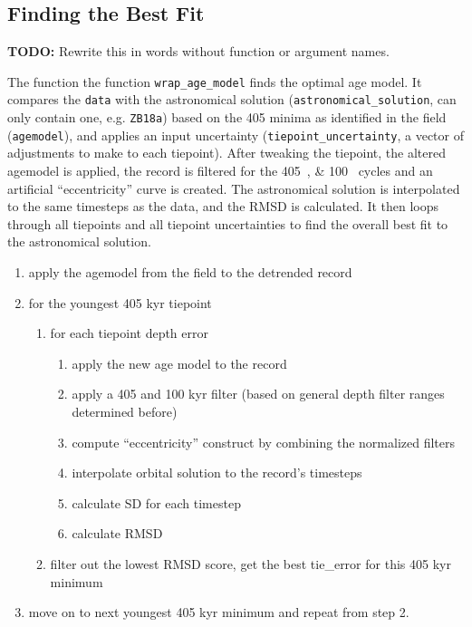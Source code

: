 \documentclass[draft]{agujournal2019}
\begin{document}
\subsection{Finding the Best Fit}

\textbf{TODO:} Rewrite this in words without function or argument names.

The function the function \texttt{wrap\_age\_model} finds the optimal age
model. It compares the \texttt{data} with the astronomical solution
(\texttt{astronomical\_solution}, can only contain one, e.g. \texttt{ZB18a})
based on the \qty{405}{\kiloyear} minima as identified in the field
(\texttt{agemodel}), and applies an input uncertainty
(\texttt{tiepoint\_uncertainty}, a vector of adjustments to make to each
tiepoint). After tweaking the tiepoint, the altered agemodel is applied, the
record is filtered for the \qtylist{405;100}{\kiloyear} cycles and an
artificial ``eccentricity'' curve is created. The astronomical solution is
interpolated to the same timesteps as the data, and the \gls{RMSD} is
calculated. It then loops through all tiepoints and all tiepoint uncertainties
to find the overall best fit to the astronomical solution.


\begin{enumerate}
\item apply the agemodel from the field to the detrended record
\item for the youngest 405 kyr tiepoint
  \begin{enumerate}
  \item for each tiepoint depth error
    \begin{enumerate}
    \item apply the new age model to the record
    \item apply a 405 and 100 kyr filter (based on general depth filter ranges
      determined before)
    \item compute ``eccentricity'' construct by combining the normalized
      filters
    \item interpolate orbital solution to the record's timesteps
    \item calculate SD for each timestep
    \item calculate RMSD
    \end{enumerate}
  \item filter out the lowest RMSD score, get the best tie\_error for this 405
    kyr minimum
  \end{enumerate}
\item move on to next youngest 405 kyr minimum and repeat from step 2.
\end{enumerate}
\end{document}
